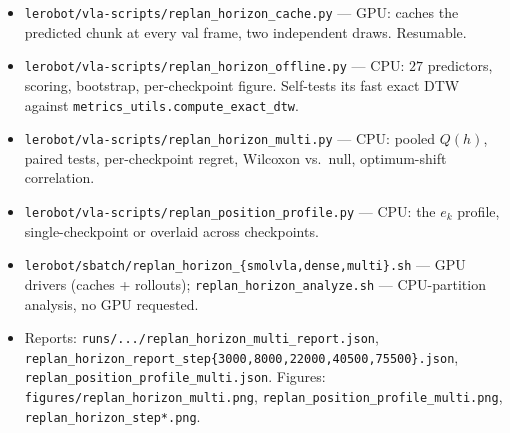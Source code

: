 \documentclass[11pt]{article}
\begin{document}
\begin{itemize}
  \item \texttt{lerobot/vla-scripts/replan\_horizon\_cache.py} --- GPU: caches the predicted chunk at
        every val frame, two independent draws. Resumable.
  \item \texttt{lerobot/vla-scripts/replan\_horizon\_offline.py} --- CPU: $27$ predictors, scoring,
        bootstrap, per-checkpoint figure. Self-tests its fast exact DTW against
        \texttt{metrics\_utils.compute\_exact\_dtw}.
  \item \texttt{lerobot/vla-scripts/replan\_horizon\_multi.py} --- CPU: pooled $Q(h)$, paired tests,
        per-checkpoint regret, Wilcoxon vs.\ null, optimum-shift correlation.
  \item \texttt{lerobot/vla-scripts/replan\_position\_profile.py} --- CPU: the $e_k$ profile,
        single-checkpoint or overlaid across checkpoints.
  \item \texttt{lerobot/sbatch/replan\_horizon\_\{smolvla,dense,multi\}.sh} --- GPU drivers (caches +
        rollouts); \texttt{replan\_horizon\_analyze.sh} --- CPU-partition analysis, no GPU requested.
  \item Reports: \texttt{runs/.../replan\_horizon\_multi\_report.json},
        \texttt{replan\_horizon\_report\_step\{3000,8000,22000,40500,75500\}.json},
        \texttt{replan\_position\_profile\_multi.json}. Figures:
        \texttt{figures/replan\_horizon\_multi.png},
        \texttt{replan\_position\_profile\_multi.png}, \texttt{replan\_horizon\_step*.png}.
\end{itemize}
\end{document}
